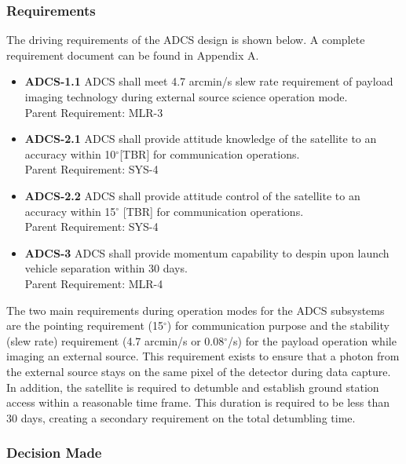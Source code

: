 \documentclass[12pt]{article}
\begin{document}
			\subsubsection{Requirements}
			The driving requirements of the ADCS design is shown below. A complete requirement document can be found in Appendix A. 
					\begin{itemize}
					\item \textbf{ADCS-1.1} ADCS shall meet 4.7 arcmin/s slew rate requirement of payload imaging technology during external source science operation mode.\\
					Parent Requirement: MLR-3
					
					\item \textbf{ADCS-2.1} ADCS shall provide attitude knowledge of the satellite to an accuracy within 10$^\circ$[TBR]  for communication operations.\\
					Parent Requirement: SYS-4
					\item \textbf{ADCS-2.2} ADCS shall provide attitude control of the satellite to an accuracy within 15$^\circ$ [TBR] for communication operations.\\
					Parent Requirement: SYS-4
					\item \textbf{ADCS-3} ADCS shall provide momentum capability to despin upon launch vehicle separation within 30 days.\\
					Parent Requirement: MLR-4
					\end{itemize}
				The two main requirements during operation modes for the ADCS subsystems are the pointing requirement (15$^\circ$) for communication purpose and the stability (slew rate) requirement (4.7 arcmin/s or 0.08$^\circ$/s) for the payload operation while imaging an external source. This requirement exists to ensure that a photon from the external source stays on the same pixel of the detector during data capture. In addition, the satellite is required to detumble and establish ground station access within a reasonable time frame. This duration is required to be less than 30 days, creating a secondary requirement on the total detumbling time. 
					\subsubsection{Decision Made}
\end{document}
